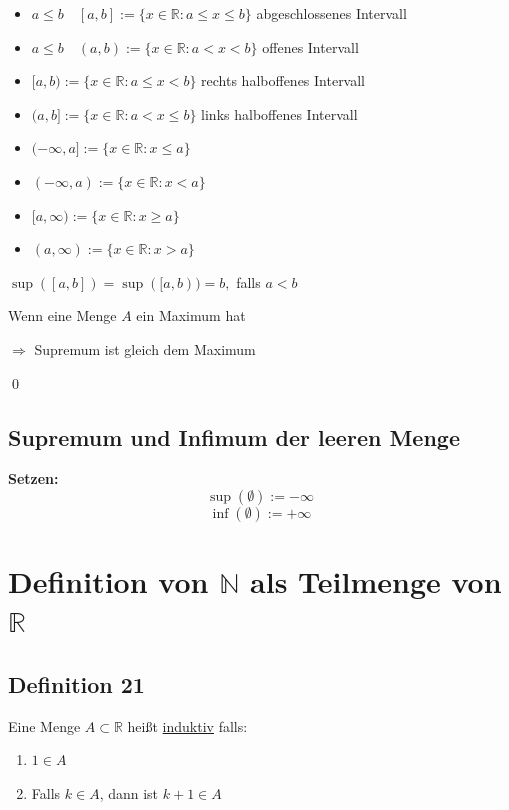 \documentclass[fleqn]{scrbook}
\renewenvironment{proof}{{\bfseries Beweis }}{\qed}
\begin{document}
\begin{itemize}
  \item $a \leq b \quad [a,b] := \{x \in \mathbb{R}:a \leq x \leq b\}$ abgeschlossenes Intervall
  \item $a \leq b \quad (a,b) := \{x \in \mathbb{R}:a < x < b\}$ offenes Intervall
  \item $[a,b) := \{x \in \mathbb{R}:a \leq x < b\}$ rechts halboffenes Intervall
  \item $(a,b]:= \{x \in \mathbb{R}:a < x \leq b\}$ links halboffenes Intervall
  \item $(-\infty,a]:= \{x \in \mathbb{R}:x \leq a\}$
  \item $(-\infty,a):= \{x \in \mathbb{R}:x < a\}$
  \item $[a,\infty):= \{x \in \mathbb{R}:x \geq a\}$
  \item $(a,\infty):= \{x \in \mathbb{R}:x > a\}$
\end{itemize}

\begin{proof}
$\sup([a,b])=\sup([a,b)) = b,$ falls $a<b \quad $

Wenn eine Menge $A$ ein Maximum hat 

$\Longrightarrow$ Supremum ist gleich dem Maximum

\end{proof}

\subsection{Supremum und Infimum der leeren Menge}
\textbf{Setzen:}
\[\sup(\emptyset):=-\infty\]
\[\inf(\emptyset):=+\infty\]

\section{Definition von $\mathbb{N}$ als Teilmenge von $\mathbb{R}$}

\subsection{Definition 21}

Eine Menge $A \subset \mathbb{R}$ heißt \underline{induktiv} falls:

\begin{enumerate}
  \item $1 \in A$
  \item Falls $k \in A$, dann ist $k+1 \in A$
\end{enumerate}
\end{document}

